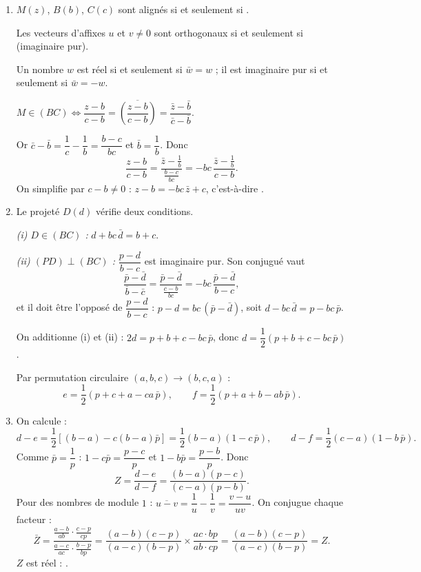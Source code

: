 \begin{enumerate}[itemsep=14pt]
  \item\leavevmode
  \begin{prop}
  $M(z)$, $B(b)$, $C(c)$ sont alignés si et seulement si .

  Les vecteurs d'affixes $u$ et $v\neq0$ sont orthogonaux si et seulement si  (imaginaire pur).

  Un nombre $w$ est réel si et seulement si $\bar w=w$ ; il est imaginaire pur si et seulement si $\bar w=-w$.
  \end{prop}
  $M\in(BC)\iff\dfrac{z-b}{c-b}=\overline{\left(\dfrac{z-b}{c-b}\right)}=\dfrac{\bar z-\bar b}{\bar c-\bar b}$.

  Or $\bar c-\bar b=\dfrac1c-\dfrac1b=\dfrac{b-c}{bc}$ et $\bar b=\dfrac1b$. Donc
  \[\dfrac{z-b}{c-b}=\dfrac{\bar z-\frac1b}{\frac{b-c}{bc}}=-bc\,\dfrac{\bar z-\frac1b}{c-b}.\]
  On simplifie par $c-b\neq0$ : $z-b=-bc\,\bar z+c$, c'est-à-dire .

  \item Le projeté $D(d)$ vérifie deux conditions.

  \emph{(i) $D\in(BC)$ :} $d+bc\,\bar d=b+c$.

  \emph{(ii) $(PD)\perp(BC)$ :} $\dfrac{p-d}{b-c}$ est imaginaire pur. Son conjugué vaut
  \[\dfrac{\bar p-\bar d}{\bar b-\bar c}=\dfrac{\bar p-\bar d}{\frac{c-b}{bc}}=-bc\,\dfrac{\bar p-\bar d}{b-c},\]
  et il doit être l'opposé de $\dfrac{p-d}{b-c}$ : $p-d=bc\,(\bar p-\bar d)$, soit $d-bc\,\bar d=p-bc\,\bar p$.

  On additionne (i) et (ii) : $2d=p+b+c-bc\,\bar p$, donc \textbf{$d=\dfrac12\left(p+b+c-bc\,\bar p\right)$}.

  Par permutation circulaire $(a,b,c)\to(b,c,a)$ :
  \[e=\dfrac12\left(p+c+a-ca\,\bar p\right),\qquad f=\dfrac12\left(p+a+b-ab\,\bar p\right).\]

  \item On calcule :
  \[d-e=\dfrac12\left[(b-a)-c(b-a)\bar p\right]=\dfrac12(b-a)(1-c\,\bar p),\qquad d-f=\dfrac12(c-a)(1-b\,\bar p).\]
  Comme $\bar p=\dfrac1p$ : $1-c\bar p=\dfrac{p-c}{p}$ et $1-b\bar p=\dfrac{p-b}{p}$. Donc
  \[Z=\dfrac{d-e}{d-f}=\dfrac{(b-a)(p-c)}{(c-a)(p-b)}.\]
  Pour des nombres de module $1$ : $\overline{u-v}=\dfrac1u-\dfrac1v=\dfrac{v-u}{uv}$. On conjugue chaque facteur :
  \[\bar Z=\dfrac{\frac{a-b}{ab}\cdot\frac{c-p}{cp}}{\frac{a-c}{ac}\cdot\frac{b-p}{bp}}=\dfrac{(a-b)(c-p)}{(a-c)(b-p)}\times\dfrac{ac\cdot bp}{ab\cdot cp}=\dfrac{(a-b)(c-p)}{(a-c)(b-p)}=Z.\]
  $Z$ est réel : .


\end{enumerate}
